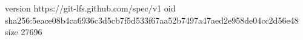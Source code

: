 version https://git-lfs.github.com/spec/v1
oid sha256:5eace08b4ca6936c3d5cb7f5d533f67aa52b7497a47aed2e958de04cc2d56e48
size 27696
